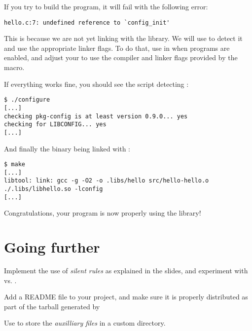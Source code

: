 If you try to build the program, it will fail with the following
error:

\begin{verbatim}
hello.c:7: undefined reference to `config_init'
\end{verbatim}

This is because we are not yet linking with the 
library. We will use  to detect it and use the
appropriate linker flags. To do that, use  in
 when programs are enabled, and adjust your
 to use the compiler and linker flags provided by
the  macro.

If everything works fine, you should see the  script
detecting :

\begin{verbatim}
$ ./configure
[...]
checking pkg-config is at least version 0.9.0... yes
checking for LIBCONFIG... yes
[...]
\end{verbatim}

And finally the  binary being linked with
:

\begin{verbatim}
$ make
[...]
libtool: link: gcc -g -O2 -o .libs/hello src/hello-hello.o  ./.libs/libhello.so -lconfig
[...]
\end{verbatim}

Congratulations, your program is now properly using the
 library!

\section{Going further}

Implement the use of {\em silent rules} as explained in the slides,
and experiment with  vs. .

Add a README file to your project, and make sure it is properly
distributed as part of the tarball generated by 

Use  to store the {\em auxilliary files} in a
custom directory.
